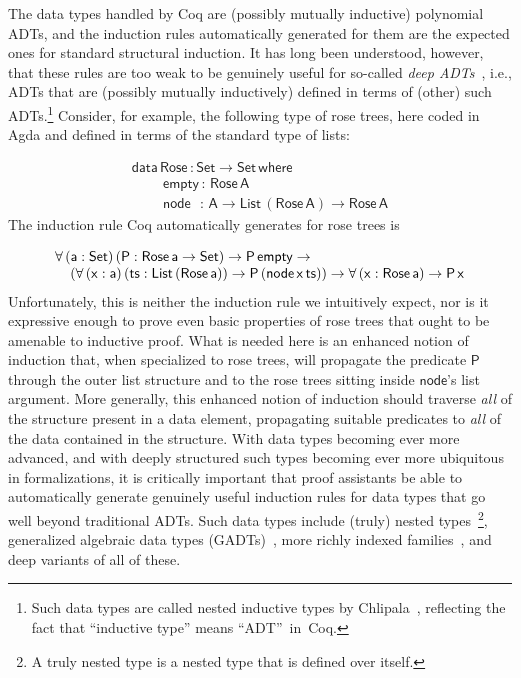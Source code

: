 \documentclass[9pt]{entcs}
\begin{document}
The data types handled by Coq are (possibly mutually inductive)
polynomial ADTs, and the induction rules automatically generated for
them are the expected ones for standard structural induction. It has
long been understood, however, that these rules are too weak to be
genuinely useful for so-called {\em deep ADTs}~\cite{jp20}, i.e., ADTs
that are (possibly mutually inductively) defined in terms of (other)
such ADTs.\footnote{Such data types are called nested inductive types
  by Chlipala~\cite{chl}, reflecting the fact that ``inductive type''
  means ``ADT''~in~Coq.} Consider, for example, the following type of
rose trees, here coded in Agda and defined in terms of the standard
type of lists:

\vspace*{-0.075in}

\[\begin{array}{l}
\mathsf{data\, Rose\, : Set \to Set\,where}\\
\mathsf{\;\;\;\;\;\;\;\;empty\, :\, Rose\,A}\\
\mathsf{\;\;\;\;\;\;\;\;node\,\,\,\, :\, A \to List\,(Rose\,A) \to Rose\,A} 
\end{array}\]
\noindent
The induction rule Coq automatically generates for rose trees is

\vspace*{-0.075in}

\[\begin{array}{l}
\mathsf{\forall\, (a : Set)\,(P : Rose\,a \to Set) \to P\,empty \to}\\
\mathsf{\hspace*{0.15in}
 (\forall\, (x : a)\,(ts :
  List\,(Rose\,a)) \to P\,(node\,x\,ts)) \to 
  \forall \,(x : Rose\,a) \to P\,x}
\end{array}\]
\noindent
Unfortunately, this is neither the induction rule we intuitively
expect, nor is it expressive enough to prove even basic properties of
rose trees that ought to be amenable to inductive proof. What is
needed here is an enhanced notion of induction that, when specialized
to rose trees, will propagate the predicate $\mathsf{P}$ through the
outer list structure and to the rose trees sitting inside
$\mathsf{node}$'s list argument. More generally, this enhanced notion
of induction should traverse {\em all} of the structure present in a
data element, propagating suitable predicates to {\em all} of the data
contained in the structure. With data types becoming ever more
advanced, and with deeply structured such types becoming ever more
ubiquitous in formalizations, it is critically important that proof
assistants
be able to automatically generate genuinely useful induction
rules for data types that go well beyond traditional ADTs. Such
data types include (truly) nested types~\cite{bm98}\footnote{A truly
  nested type is a nested type that is defined over itself.},
generalized algebraic data types
(GADTs)~\cite{ch03,pvww06,sp04,xcc03}, more richly indexed
families~\cite{ch88}, and deep variants of all of these.
\end{document}
